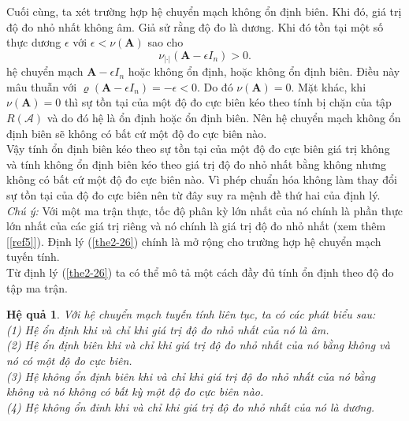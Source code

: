 \documentclass[14pt,a4paper,oneside]{report}		%
\newtheorem{corollary}[theorem]{Hệ quả}
\theoremstyle{definition}
\begin{document}
Cuối cùng, ta xét trường hợp hệ chuyển mạch không ổn định biên. Khi đó, giá trị độ đo nhỏ nhất không âm. Giả sử rằng độ đo là dương. Khi đó tồn tại một số thực dương $\epsilon$ với $\epsilon <\nu(\mathbf{A})$ sao cho
$$\nu_{|\cdot|}(\mathbf{A}-\epsilon I_n)>0.$$
hệ chuyển mạch $\mathbf{A}-\epsilon I_n$ hoặc không ổn định, hoặc không ổn định biên. Điều này mâu thuẫn với $\varrho(\mathbf{A}-\epsilon I_n)=-\epsilon <0$. Do đó $\nu(\mathbf{A})=0$. Mặt khác, khi $\nu(\mathbf{A})=0$ thì sự tồn tại của một độ đo cực biên kéo theo tính bị chặn của tập $R(\mathcal{A})$ và do đó hệ là ổn định hoặc ổn định biên. Nên hệ chuyển mạch không ổn định biên sẽ không có bất cứ một độ đo cực biên nào.\\

Vậy tính ổn định biên kéo theo sự tồn tại của một độ đo cực biên giá trị không và tính không ổn định biên kéo theo giá trị độ đo nhỏ nhất bằng không nhưng không có bất cứ một độ đo cực biên nào. Vì phép chuẩn hóa không làm thay đổi sự tồn tại của độ đo cực biên nên từ đây suy ra mệnh đề thứ hai của định lý.\\

\textit{Chú ý:} Với một ma trận thực, tốc độ phân kỳ lớn nhất của nó chính là phần thực lớn nhất của các giá trị riêng và nó chính là giá trị độ đo nhỏ nhất (xem thêm [\ref{ref5}]). Định lý (\ref{the2-26}) chính là mở rộng cho trường hợp hệ chuyển mạch tuyến tính.\\

Từ định lý (\ref{the2-26}) ta có thể mô tả một cách đầy đủ tính ổn định theo độ đo tập ma trận.

\begin{corollary} \label{co2-29}
Với hệ chuyển mạch tuyến tính liên tục, ta có các phát biểu sau:\\
(1) Hệ ổn định khi và chỉ khi giá trị độ đo nhỏ nhất của nó là âm.\\
(2) Hệ ổn định biên khi và chỉ khi giá trị độ đo nhỏ nhất của nó bằng không và nó có một độ đo cực biên.\\
(3) Hệ không ổn định biên khi và chỉ khi giá trị độ đo nhỏ nhất của nó bằng không và nó không có bất kỳ một độ đo cực biên nào.\\
(4) Hệ không ổn đinh khi và chỉ khi giá trị độ đo nhỏ nhất của nó là dương.
\end{corollary}
\end{document}
